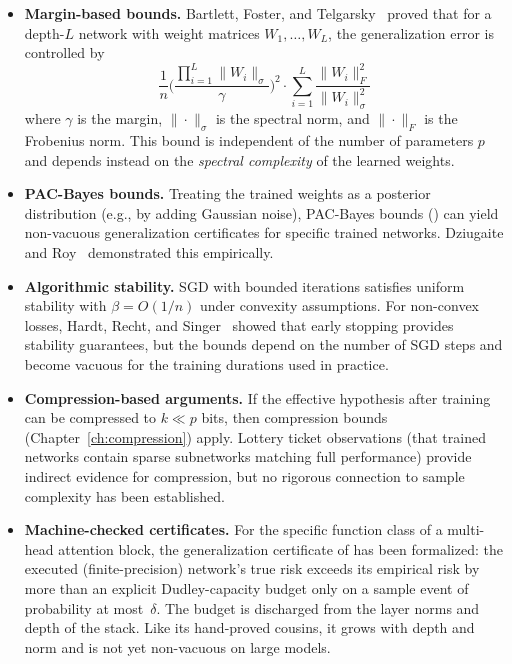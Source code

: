 \begin{itemize}[leftmargin=*]
\item \textbf{Margin-based bounds.}  Bartlett, Foster, and
  Telgarsky~\cite{BartlettFosterTelgarsky2017} proved that for a
  depth-$L$ network with weight matrices $W_1, \ldots, W_L$, the
  generalization error is controlled by
  \[
    \frac{1}{n}\biggl(\frac{\prod_{i=1}^L \|W_i\|_\sigma}{\gamma}\biggr)^2
    \cdot \sum_{i=1}^L \frac{\|W_i\|_F^2}{\|W_i\|_\sigma^2}
  \]
  where $\gamma$ is the margin, $\|\cdot\|_\sigma$ is the spectral norm,
  and $\|\cdot\|_F$ is the Frobenius norm.  This bound is independent of the
  number of parameters $p$ and depends instead on the \emph{spectral
  complexity} of the learned weights.

\item \textbf{PAC-Bayes bounds.}  Treating the trained weights as a
  posterior distribution (e.g., by adding Gaussian noise), PAC-Bayes
  bounds () can yield non-vacuous generalization
  certificates for specific trained networks.  Dziugaite and
  Roy~\cite{DziugaiteRoy2017} demonstrated this empirically.

\item \textbf{Algorithmic stability.}  SGD with bounded iterations satisfies
  uniform stability with $\beta = O(1/n)$ under convexity assumptions.
  For non-convex losses, Hardt, Recht, and Singer~\cite{HardtRechtSinger2016}
  showed that early stopping provides stability guarantees, but the bounds
  depend on the number of SGD steps and become vacuous for the training
  durations used in practice.

\item \textbf{Compression-based arguments.}  If the effective hypothesis
  after training can be compressed to $k \ll p$ bits, then compression
  bounds (Chapter~\ref{ch:compression}) apply.  Lottery ticket
  observations (that trained networks contain sparse subnetworks matching
  full performance) provide indirect evidence for compression, but no
  rigorous connection to sample complexity has been established.

\item \textbf{Machine-checked certificates.}  For the specific function class
  of a multi-head attention block, the generalization certificate of
   has been formalized: the executed
  (finite-precision) network's true risk exceeds its empirical risk by more
  than an explicit Dudley-capacity budget only on a sample event of
  probability at most~$\delta$.  The budget
  is discharged from the layer norms and depth of the
  stack.  Like its hand-proved cousins, it
  grows with depth and norm and is not yet non-vacuous on large models.
\end{itemize}

